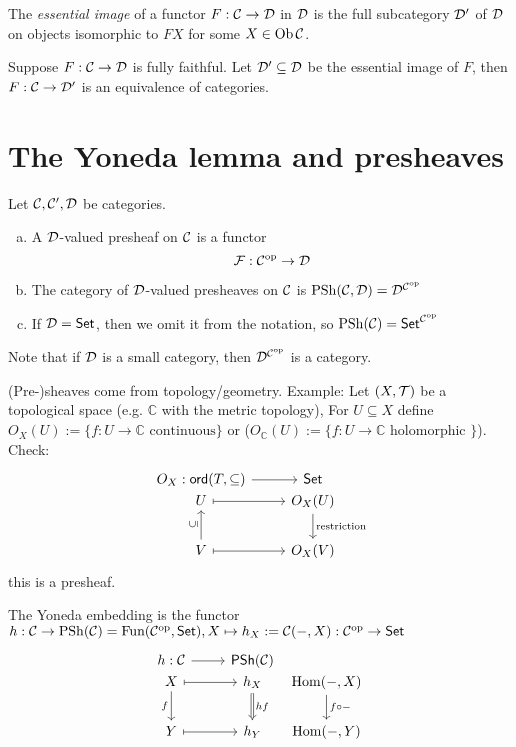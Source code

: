 \documentclass[a4paper]{report}
\begin{document}
\begin{defi}
The \emph{essential image} of a functor $F: \mathcal{C} \to \mathcal{D}$ in $\mathcal{D}$ is the full subcategory $\mathcal{D}'$ of $\mathcal{D}$ on objects isomorphic to $FX$ for some $X \in \operatorname{Ob} \mathcal{C}$.
\end{defi}
\begin{cor}
  Suppose $F: \mathcal{C} \to \mathcal{D}$ is fully faithful. Let $\mathcal{D}' \subseteq \mathcal{D}$ be the essential image of $F$, then $F: \mathcal{C} \to \mathcal{D}'$ is an equivalence of categories.
\end{cor}

\section{The Yoneda lemma and presheaves}
Let $\mathcal{C}, \mathcal{C}', \mathcal{D}$ be categories.
\begin{defi}
  \begin{enumerate}[(a)]
    \item A $\mathcal{D}$-valued presheaf on $\mathcal{C}$ is a functor \[\mathcal F: \mathcal{C}^\mathrm{op} \to \mathcal{D}\]
    \item The category of $\mathcal{D}$-valued presheaves on $\mathcal{C}$ is $\mathrm{PSh}(\mathcal{C},\mathcal{D}) = \mathcal{D}^{\mathcal{C}^\mathrm{op}}$
          \item If $\mathcal{D} = \mathsf{Set}$, then we omit it from the notation, so $\mathrm{PSh}(\mathcal{C}) = \mathsf{Set}^{\mathcal{C}^\mathrm{op}}$
  \end{enumerate}
Note that if $\mathcal{D}$ is a small category, then $\mathcal{D}^{\mathcal{C}^\mathrm{op}}$ is a category.
\end{defi}
\begin{rem*}
  (Pre-)sheaves come from topology/geometry. Example: Let $(X,\mathcal{T})$ be a topological space (e.g. $\mathbb C$ with the metric topology), For $U \subseteq X$ define $O_{X}(U):= \{f: U \to \mathbb C\text{ continuous}\}$ or ($O_{\mathbb C}(U):= \{f: U \to \mathbb C \text{ holomorphic }\}$). Check:
  \[\begin{tikzcd}
{O_X: \mathsf{ord}(T, \subseteq)}\arrow[r]                           & \Set                                   \\[-20pt]
U \arrow[r, maps to]                                        & O_X(U) \arrow[d, "\text{restriction}"] \\
V \arrow[u, "\vsubseteq"] \arrow[r, maps to] & O_X(V)
\end{tikzcd}
  \]this is a presheaf.
\end{rem*}

\begin{defi}The Yoneda embedding is the functor $h: \mathcal{C} \to \mathrm{PSh}(\mathcal{C}) = \text{Fun}(\mathcal{C}^\mathrm{op}, \mathsf{Set}), X \mapsto h_{X}:= \mathcal{C}(-, X): \mathcal{C}^\mathrm{op} \to \mathsf{Set}$
\[\begin{tikzcd}
h: \mathcal C \arrow[r]     & \mathsf{PSh}(\mathcal C)        &[-20]                                            \\[-20]
X \arrow[r, maps to] \arrow[d, "f"'] & h_X \arrow[d, "hf", Rightarrow] & {\mathrm{Hom}(-,X)} \arrow[d, "f \circ -"] \\
Y \arrow[r, maps to]                 & h_Y                             & {\mathrm{Hom}(-,Y)}
\end{tikzcd}\]
\end{defi}
\end{document}
